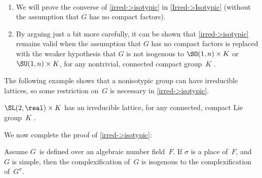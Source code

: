 \begin{rems} \label{Irred->IsotypicRem} \ 
\noprelistbreak
	\begin{enumerate}
	\item We will prove the converse of \cref{irred->isotypic} in \cref{Irred->Isotypic} (without the assumption that $G$ has no compact factors).
	
	\item By arguing just a bit more carefully, it can be shown
that \cref{irred->isotypic} remains valid when the assumption that $G$ has no compact factors is replaced with the weaker hypothesis that $G$ is not isogenous to $\SO(1,n)
\times K$ or $\SU(1,n) \times K$, for any nontrivial,
connected compact group~$K$ . 

	\end{enumerate}
 \end{rems}

The following example shows that a nonisotypic group can have irreducible lattices, so some restriction on~$G$ is
necessary in \cref{irred->isotypic}.

\begin{eg}
 $\SL(2,\real) \times K$ has an irreducible lattice, for any
connected, compact Lie group~$K$ .
 \end{eg}

We now complete the proof of \cref{irred->isotypic}:

\begin{lem} \label{Gsigma=G}
 Assume $G$~is defined over an algebraic number field~$F$.
 If $\sigma$ is a place of~$F$,
 and
  $G$ is simple,
  then the complexification of~$G$ is isogenous to the complexification of~$G^\sigma$.
 \end{lem}


